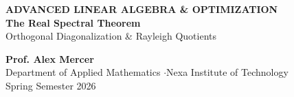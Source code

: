 \documentclass[10pt, aspectratio=169]{beamer}
\begin{document}
\begin{frame}[plain]
  \vspace*{0.8cm}
  \begin{center}
    {\color{teal}\small\bfseries ADVANCED LINEAR ALGEBRA \& OPTIMIZATION} \\[0.3cm]
    {\color{navy}\LARGE\bfseries The Real Spectral Theorem} \\[0.2cm]
    {\color{slate}\large Orthogonal Diagonalization \& Rayleigh Quotients} \\[0.5cm]
    
    \par\vspace{0.5cm}
    
    {\color{navy}\bfseries Prof. Alex Mercer} \\[0.1cm]
    {\color{slate}\small Department of Applied Mathematics \quad$\cdot$\quad Nexa Institute of Technology} \\[0.1cm]
    {\color{slate}\tiny Spring Semester 2026}
  \end{center}
\end{frame}
\end{document}
